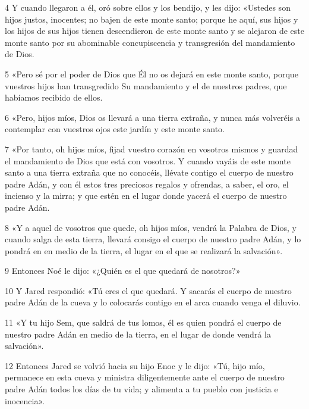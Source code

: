 \par 4 Y cuando llegaron a él, oró sobre ellos y los bendijo, y les dijo: «Ustedes son hijos justos, inocentes; no bajen de este monte santo; porque he aquí, sus hijos y los hijos de sus hijos tienen descendieron de este monte santo y se alejaron de este monte santo por su abominable concupiscencia y transgresión del mandamiento de Dios.

\par 5 «Pero sé por el poder de Dios que Él no os dejará en este monte santo, porque vuestros hijos han transgredido Su mandamiento y el de nuestros padres, que habíamos recibido de ellos.

\par 6 «Pero, hijos míos, Dios os llevará a una tierra extraña, y nunca más volveréis a contemplar con vuestros ojos este jardín y este monte santo.

\par 7 «Por tanto, oh hijos míos, fijad vuestro corazón en vosotros mismos y guardad el mandamiento de Dios que está con vosotros. Y cuando vayáis de este monte santo a una tierra extraña que no conocéis, llévate contigo el cuerpo de nuestro padre Adán, y con él estos tres preciosos regalos y ofrendas, a saber, el oro, el incienso y la mirra; y que estén en el lugar donde yacerá el cuerpo de nuestro padre Adán.

\par 8 «Y a aquel de vosotros que quede, oh hijos míos, vendrá la Palabra de Dios, y cuando salga de esta tierra, llevará consigo el cuerpo de nuestro padre Adán, y lo pondrá en en medio de la tierra, el lugar en el que se realizará la salvación».

\par 9 Entonces Noé le dijo: «¿Quién es el que quedará de nosotros?»

\par 10 Y Jared respondió: «Tú eres el que quedará. Y sacarás el cuerpo de nuestro padre Adán de la cueva y lo colocarás contigo en el arca cuando venga el diluvio.

\par 11 «Y tu hijo Sem, que saldrá de tus lomos, él es quien pondrá el cuerpo de nuestro padre Adán en medio de la tierra, en el lugar de donde vendrá la salvación».

\par 12 Entonces Jared se volvió hacia su hijo Enoc y le dijo: «Tú, hijo mío, permanece en esta cueva y ministra diligentemente ante el cuerpo de nuestro padre Adán todos los días de tu vida; y alimenta a tu pueblo con justicia e inocencia».

